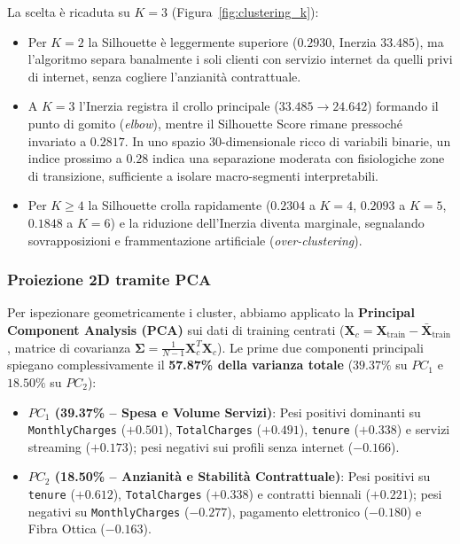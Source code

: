 \documentclass[11pt,a4paper]{article}
\begin{document}
La scelta è ricaduta su \textbf{$K=3$} (Figura~\ref{fig:clustering_k}):
\begin{itemize}
    \item Per $K=2$ la Silhouette è leggermente superiore ($0.2930$, Inerzia $33.485$), ma l'algoritmo separa banalmente i soli clienti con servizio internet da quelli privi di internet, senza cogliere l'anzianità contrattuale.
    \item A $K=3$ l'Inerzia registra il crollo principale ($33.485 \rightarrow 24.642$) formando il punto di gomito (\textit{elbow}), mentre il Silhouette Score rimane pressoché invariato a \textbf{$0.2817$}. In uno spazio 30-dimensionale ricco di variabili binarie, un indice prossimo a $0.28$ indica una separazione moderata con fisiologiche zone di transizione, sufficiente a isolare macro-segmenti interpretabili.
    \item Per $K \ge 4$ la Silhouette crolla rapidamente ($0.2304$ a $K=4$, $0.2093$ a $K=5$, $0.1848$ a $K=6$) e la riduzione dell'Inerzia diventa marginale, segnalando sovrapposizioni e frammentazione artificiale (\textit{over-clustering}).
\end{itemize}

\subsubsection{Proiezione 2D tramite PCA}
Per ispezionare geometricamente i cluster, abbiamo applicato la \textbf{Principal Component Analysis (PCA)} sui dati di training centrati ($\mathbf{X}_c = \mathbf{X}_{\text{train}} - \bar{\mathbf{X}}_{\text{train}}$, matrice di covarianza $\boldsymbol{\Sigma} = \frac{1}{N-1}\mathbf{X}_c^T\mathbf{X}_c$). Le prime due componenti principali spiegano complessivamente il \textbf{57.87\% della varianza totale} ($39.37\%$ su $PC_1$ e $18.50\%$ su $PC_2$):
\begin{itemize}
    \item \textbf{$PC_1$ (39.37\% -- Spesa e Volume Servizi)}: Pesi positivi dominanti su \texttt{MonthlyCharges} ($+0.501$), \texttt{TotalCharges} ($+0.491$), \texttt{tenure} ($+0.338$) e servizi streaming ($+0.173$); pesi negativi sui profili senza internet ($-0.166$).
    \item \textbf{$PC_2$ (18.50\% -- Anzianità e Stabilità Contrattuale)}: Pesi positivi su \texttt{tenure} ($+0.612$), \texttt{TotalCharges} ($+0.338$) e contratti biennali ($+0.221$); pesi negativi su \texttt{MonthlyCharges} ($-0.277$), pagamento elettronico ($-0.180$) e Fibra Ottica ($-0.163$).
\end{itemize}
\end{document}
